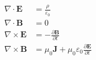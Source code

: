 \documentclass{article}
\begin{document}
\[
\begin{aligned}
\nabla \cdot \mathbf{E} &= \frac{\rho}{\varepsilon_0} \\
\nabla \cdot \mathbf{B} &= 0 \\
\nabla \times \mathbf{E} &= -\frac{\partial \mathbf{B}}{\partial t} \\
\nabla \times \mathbf{B} &= \mu_0 \mathbf{J} + \mu_0 \varepsilon_0 \frac{\partial \mathbf{E}}{\partial t}
\end{aligned}
\]
\end{document}
